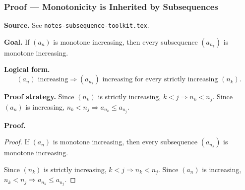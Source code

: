 
\clearpage
{}
\hypertarget{proof-RA-ABB-P-mono-inherited}{}

\subsubsection[Monotonicity is Inherited by Subsequences]{Proof --- Monotonicity is Inherited by Subsequences}

\bigskip

\noindent
\textbf{Source.}
See \texttt{notes-subsequence-toolkit.tex}.

\vspace{0.75em}

\noindent
\textbf{Goal.}
If $(a_n)$ is monotone increasing, then every subsequence $(a_{n_k})$ is monotone increasing.

\vspace{0.75em}

\noindent
\textbf{Logical form.}
\[
  (a_n) \text{ increasing} \Rightarrow (a_{n_k}) \text{ increasing for every strictly increasing } (n_k).
\]

\vspace{0.75em}

\noindent
\textbf{Proof strategy.}
Since $(n_k)$ is strictly increasing, $k < j \Rightarrow n_k < n_j$. Since $(a_n)$ is increasing, $n_k < n_j \Rightarrow a_{n_k} \le a_{n_j}$.

\vspace{0.75em}

\noindent
\textbf{Proof.}
\begin{proof}
\Claim If $(a_n)$ is monotone increasing, then every subsequence $(a_{n_k})$ is monotone increasing.

\Given 

\Goal 

\Strategy Since $(n_k)$ is strictly increasing, $k < j \Rightarrow n_k < n_j$. Since $(a_n)$ is increasing, $n_k < n_j \Rightarrow a_{n_k} \le a_{n_j}$.

\medskip


\end{proof}

